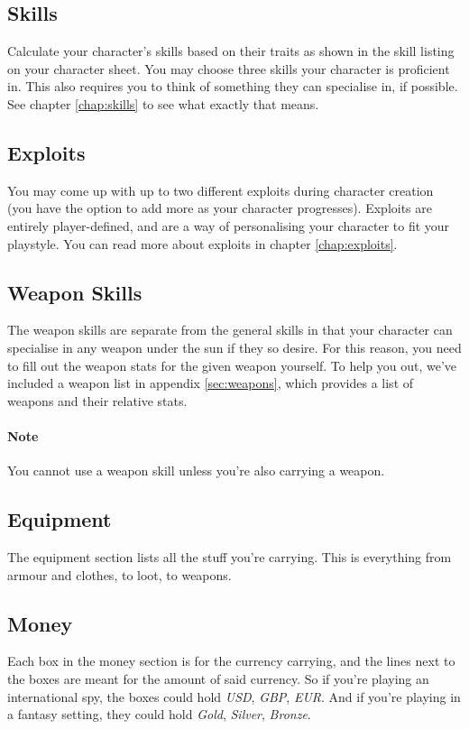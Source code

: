 \subsection{Skills}
Calculate your character's skills based on their traits as shown in the skill listing on your character sheet.
You may choose three skills your character is proficient in.
This also requires you to think of something they can specialise in, if possible.
See chapter \ref{chap:skills} to see what exactly that means.

\subsection{Exploits}
You may come up with up to two different exploits during character creation (you have the option to add more as your character progresses).
Exploits are entirely player-defined, and are a way of personalising your character to fit your playstyle.
You can read more about exploits in chapter \ref{chap:exploits}.

\subsection{Weapon Skills}
The weapon skills are separate from the general skills in that your character can specialise in any weapon under the sun if they so desire.
For this reason, you need to fill out the weapon stats for the given weapon yourself.
To help you out, we've included a weapon list in appendix \ref{sec:weapons}, which provides a list of weapons and their relative stats.

\paragraph{Note} You cannot use a weapon skill unless you're also carrying a weapon.

\subsection{Equipment}
The equipment section lists all the stuff you're carrying.
This is everything from armour and clothes, to loot, to weapons.

\subsection{Money}
Each box in the money section is for the currency carrying, and the lines next to the boxes are meant for the amount of said currency.
So if you're playing an international spy, the boxes could hold \textit{USD}, \textit{GBP}, \textit{EUR}.
And if you're playing in a fantasy setting, they could hold \textit{Gold}, \textit{Silver}, \textit{Bronze}.
